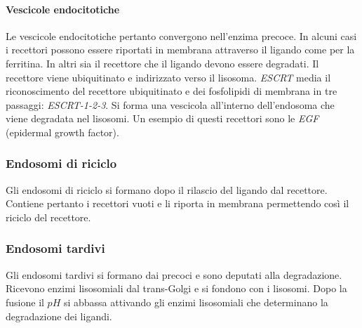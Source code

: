 			\paragraph{Vescicole endocitotiche}
			Le vescicole endocitotiche pertanto convergono nell'enzima precoce.
			In alcuni casi i recettori possono essere riportati in membrana attraverso il ligando come per la ferritina.
			In altri sia il recettore che il ligando devono essere degradati.
			Il recettore viene ubiquitinato e indirizzato verso il lisosoma.
			\emph{ESCRT} media il riconoscimento del recettore ubiquitinato e dei fosfolipidi di membrana in tre passaggi: \emph{ESCRT-1-2-3}.
			Si forma una vescicola all'interno dell'endosoma che viene degradata nel lisosomi.
			Un esempio di questi recettori sono le \emph{EGF} (epidermal growth factor).
		

		\subsubsection{Endosomi di riciclo}
		Gli endosomi di riciclo si formano dopo il rilascio del ligando dal recettore.
		Contiene pertanto i recettori vuoti e li riporta in membrana permettendo cos\`i il riciclo del recettore.

		\subsubsection{Endosomi tardivi}
		Gli endosomi tardivi si formano dai precoci e sono deputati alla degradazione.
		Ricevono enzimi lisosomiali dal trans-Golgi e si fondono con i lisosomi.
		Dopo la fusione il $pH$ si abbassa attivando gli enzimi lisosomiali che determinano la degradazione dei ligandi.
	



